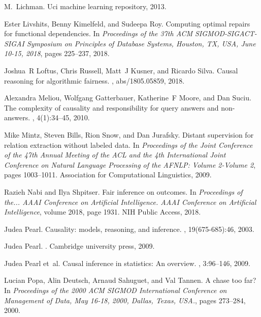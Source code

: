 M.~Lichman.
\newblock Uci machine learning repository, 2013.

Ester Livshits, Benny Kimelfeld, and Sudeepa Roy.
\newblock Computing optimal repairs for functional dependencies.
\newblock In {\em Proceedings of the 37th {ACM} {SIGMOD-SIGACT-SIGAI} Symposium
  on Principles of Database Systems, Houston, TX, USA, June 10-15, 2018}, pages
  225--237, 2018.

Joshua~R Loftus, Chris Russell, Matt~J Kusner, and Ricardo Silva.
\newblock Causal reasoning for algorithmic fairness.
, abs/1805.05859, 2018.

Alexandra Meliou, Wolfgang Gatterbauer, Katherine~F Moore, and Dan Suciu.
\newblock The complexity of causality and responsibility for query answers and
  non-answers.
, 4(1):34--45, 2010.

Mike Mintz, Steven Bills, Rion Snow, and Dan Jurafsky.
\newblock Distant supervision for relation extraction without labeled data.
\newblock In {\em Proceedings of the Joint Conference of the 47th Annual
  Meeting of the ACL and the 4th International Joint Conference on Natural
  Language Processing of the AFNLP: Volume 2-Volume 2}, pages 1003--1011.
  Association for Computational Linguistics, 2009.

Razieh Nabi and Ilya Shpitser.
\newblock Fair inference on outcomes.
\newblock In {\em Proceedings of the... AAAI Conference on Artificial
  Intelligence. AAAI Conference on Artificial Intelligence}, volume 2018, page
  1931. NIH Public Access, 2018.

Judea Pearl.
\newblock Causality: models, reasoning, and inference.
, 19(675-685):46, 2003.

Judea Pearl.
.
\newblock Cambridge university press, 2009.

Judea Pearl et~al.
\newblock Causal inference in statistics: An overview.
, 3:96--146, 2009.

Lucian Popa, Alin Deutsch, Arnaud Sahuguet, and Val Tannen.
\newblock A chase too far?
\newblock In {\em Proceedings of the 2000 {ACM} {SIGMOD} International
  Conference on Management of Data, May 16-18, 2000, Dallas, Texas, {USA.}},
  pages 273--284, 2000.

